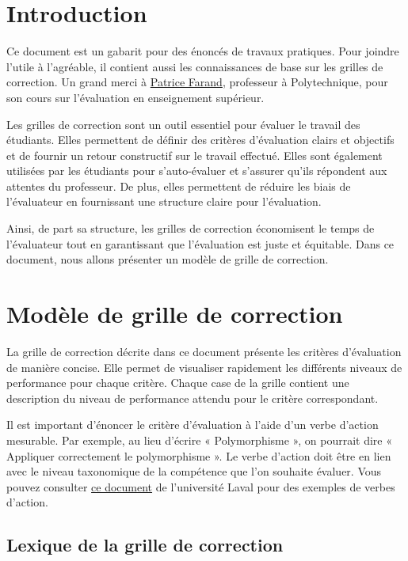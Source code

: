 \documentclass[letterpaper, 12pt]{article}
\begin{document}
\section{Introduction}

Ce document est un gabarit pour des énoncés de travaux pratiques. Pour joindre
l'utile à l'agréable, il contient aussi les connaissances de base sur les
grilles de correction. Un grand merci à \href{https://www.polymtl.ca/expertises/farand-patrice}
{Patrice Farand}, professeur à Polytechnique, pour son cours sur l'évaluation
en enseignement supérieur.

Les grilles de correction sont un outil essentiel pour évaluer le travail des
étudiants. Elles permettent de définir des critères d'évaluation clairs et
objectifs et de fournir un retour constructif sur le travail effectué. Elles
sont également utilisées par les étudiants pour s'auto-évaluer et s'assurer
qu'ils répondent aux attentes du professeur. De plus, elles permettent de
réduire les biais de l'évaluateur en fournissant une structure claire pour
l'évaluation.

Ainsi, de part sa structure, les grilles de correction économisent le temps de
l'évaluateur tout en garantissant que l'évaluation est juste et équitable. Dans
ce document, nous allons présenter un modèle de grille de correction.

\section{Modèle de grille de correction}

La grille de correction décrite dans ce document présente les critères
d'évaluation de manière concise. Elle permet de visualiser rapidement les
différents niveaux de performance pour chaque critère. Chaque case de la grille
contient une description du niveau de performance attendu pour le critère
correspondant.

Il est important d'énoncer le critère d'évaluation à l'aide d'un verbe d'action
mesurable. Par exemple, au lieu d'écrire « Polymorphisme », on
pourrait dire « Appliquer correctement le polymorphisme ». Le verbe d'action
doit être en lien avec le niveau taxonomique de la compétence que l'on souhaite
évaluer. Vous pouvez consulter 
\href{https://www.enseigner.ulaval.ca/system/files/public/pedagogie/preparer-votre-cours/taxonomie-de-bloom-revisee.pdf}
{ce document} de l'université Laval pour des exemples de verbes d'action.

\subsection{Lexique de la grille de correction}
\end{document}
